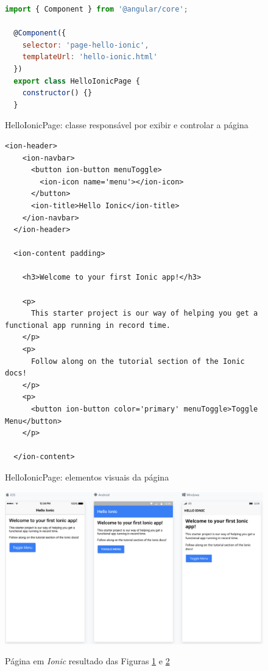 \begin{figure}[ht]
\begin{lstlisting}[language=JavaScript]
  import { Component } from '@angular/core';

  @Component({
    selector: 'page-hello-ionic',
    templateUrl: 'hello-ionic.html'
  })
  export class HelloIonicPage {
    constructor() {}
  }
\end{lstlisting}
\caption{HelloIonicPage: classe responsável por exibir e controlar a página}
\label{fig:hello_ionic_ts}
\end{figure}

\begin{figure}[ht]
\caption{HelloIonicPage: elementos visuais da página}
\begin{lstlisting}[language=ionicHtml]
  <ion-header>
    <ion-navbar>
      <button ion-button menuToggle>
        <ion-icon name='menu'></ion-icon>
      </button>
      <ion-title>Hello Ionic</ion-title>
    </ion-navbar>
  </ion-header>

  <ion-content padding>

    <h3>Welcome to your first Ionic app!</h3>

    <p>
      This starter project is our way of helping you get a functional app running in record time.
    </p>
    <p>
      Follow along on the tutorial section of the Ionic docs!
    </p>
    <p>
      <button ion-button color='primary' menuToggle>Toggle Menu</button>
    </p>

  </ion-content>
\end{lstlisting}
\doautor
\label{fig:hello_ionic_html}
\end{figure}

\begin{figure}[ht]
  \centering
  \caption{Página em \textit{Ionic} resultado  das Figuras \ref{fig:hello_ionic_ts} e \ref{fig:hello_ionic_html}}
  \includegraphics[scale=.4]{imagens/hello_world_ionic.png}
  \doautor
  \label{fig:hello_world_ionic}
\end{figure}

